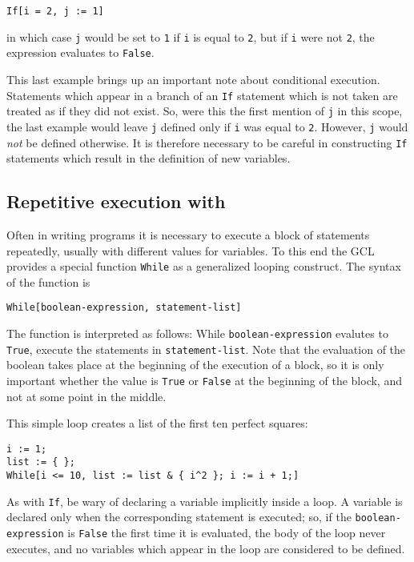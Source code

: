 \begin{verbatim}
If[i = 2, j := 1]
\end{verbatim}

\noindent in which case \verb+j+ would be set to \verb+1+ if \verb+i+
is equal to \verb+2+, but if \verb+i+ were not \verb+2+, the expression
evaluates to \verb+False+.

This last example brings up an important note about conditional
execution.  Statements which appear in a branch of an \verb+If+
statement which is not taken are treated as if they did not exist.
So, were this the first mention of \verb+j+ in this scope, the last
example would leave \verb+j+ defined only if \verb+i+ was equal to
\verb+2+.  However, \verb+j+ would {\em not} be defined otherwise.  It
is therefore necessary to be careful in constructing \verb+If+
statements which result in the definition of new variables.

\subsection{Repetitive execution with }

Often in writing programs it is necessary to execute a block of
statements repeatedly, usually with different values for variables.
To this end the GCL provides a special function \verb+While+ as a
generalized looping construct.  The syntax of the function is

\begin{verbatim}
While[boolean-expression, statement-list]
\end{verbatim}

The function is interpreted as follows: While
\verb+boolean-expression+ evalutes to \verb+True+, execute the
statements in \verb+statement-list+.  Note that the evaluation of the
boolean takes place at the beginning of the execution of a block, so
it is only important whether the value is \verb+True+ or \verb+False+
at the beginning of the block, and not at some point in the middle.

This simple loop creates a list of the first ten perfect squares: 

\begin{verbatim}
i := 1;
list := { };
While[i <= 10, list := list & { i^2 }; i := i + 1;]
\end{verbatim}

As with \verb+If+, be wary of declaring a variable implicitly inside a
loop.  A variable is declared only when the corresponding statement is
executed; so, if the \verb+boolean-expression+ is \verb+False+ the
first time it is evaluated, the body of the loop never executes, and
no variables which appear in the loop are considered to be defined.


